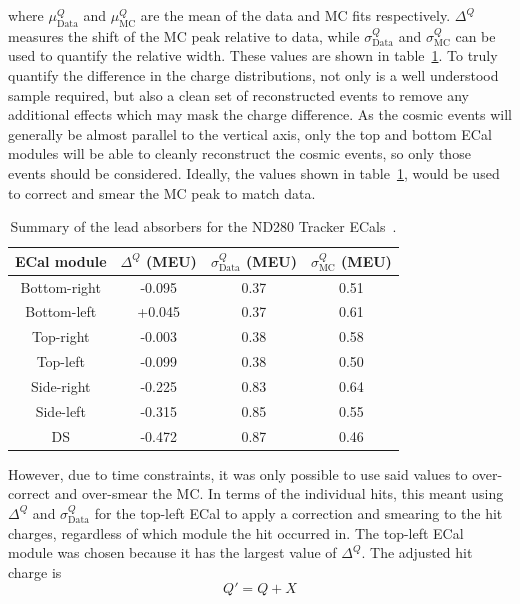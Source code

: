 where $\mu_{\textrm{Data}}^Q$ and $\mu_{\textrm{MC}}^Q$ are the mean of the data and MC fits respectively.  $\Delta^Q$ measures the shift of the MC peak relative to data, while $\sigma_{\textrm{Data}}^{Q}$ and $\sigma_{\textrm{MC}}^{Q}$ can be used to quantify the relative width.  These values are shown in table~\ref{table:HitChargeFitValues}.  To truly quantify the difference in the charge distributions, not only is a well understood sample required, but also a clean set of reconstructed events to remove any additional effects which may mask the charge difference.  As the cosmic events will generally be almost parallel to the vertical axis, only the top and bottom ECal modules will be able to cleanly reconstruct the cosmic events, so only those events should be considered.  Ideally, the values shown in table~\ref{table:HitChargeFitValues}, would be used to correct and smear the MC peak to match data.  
\begin{table}[b!]
  \begin{tabular}{ c c c c }
   ECal module & $\Delta^{Q}$ (MEU) & $\sigma_{\textrm{Data}}^Q$ (MEU) & $\sigma_{\textrm{MC}}^Q$ (MEU) \\ \hline \hline
   Bottom-right & -0.095 & 0.37 & 0.51 \\
   Bottom-left & +0.045 & 0.37 & 0.61 \\
   Top-right & -0.003 & 0.38 & 0.58 \\
   Top-left & -0.099 & 0.38 & 0.50 \\ \hline
   Side-right & -0.225 & 0.83 & 0.64 \\
   Side-left & -0.315 & 0.85 & 0.55 \\
   DS & -0.472 & 0.87 & 0.46 \\
  \end{tabular}
  \caption{Summary of the lead absorbers for the ND280 Tracker ECals~\cite{1748-0221-8-10-P10019}.}
  \label{table:HitChargeFitValues}
\end{table}
However, due to time constraints, it was only possible to use said values to over-correct and over-smear the MC.  In terms of the individual hits, this meant using $\Delta^{Q}$ and $\sigma_{\textrm{Data}}^Q$ for the top-left ECal to apply a correction and smearing to the hit charges, regardless of which module the hit occurred in.  The top-left ECal module was chosen because it  has the largest value of $\Delta^{Q}$.  The adjusted hit charge is
\begin{equation}
Q' = Q + X
\label{eqn:HitChargeCorrection}
\end{equation}
